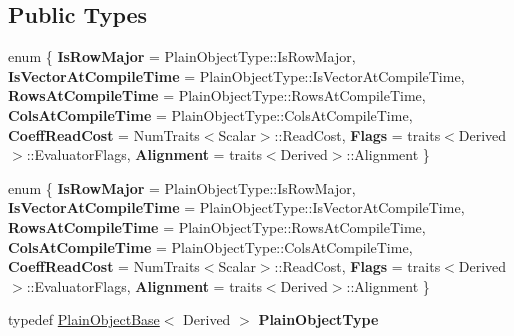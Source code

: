 \subsection*{Public Types}
\begin{DoxyCompactItemize}
\item 
\mbox{\label{struct_eigen_1_1internal_1_1evaluator_3_01_plain_object_base_3_01_derived_01_4_01_4_a0f2405d7d8d87297e15fea258be9bc15}} 
enum \{ \newline
{\bfseries Is\+Row\+Major} = Plain\+Object\+Type\+:\+:Is\+Row\+Major, 
{\bfseries Is\+Vector\+At\+Compile\+Time} = Plain\+Object\+Type\+:\+:Is\+Vector\+At\+Compile\+Time, 
{\bfseries Rows\+At\+Compile\+Time} = Plain\+Object\+Type\+:\+:Rows\+At\+Compile\+Time, 
{\bfseries Cols\+At\+Compile\+Time} = Plain\+Object\+Type\+:\+:Cols\+At\+Compile\+Time, 
\newline
{\bfseries Coeff\+Read\+Cost} = Num\+Traits$<$Scalar$>$\+:\+:Read\+Cost, 
{\bfseries Flags} = traits$<$Derived$>$\+:\+:Evaluator\+Flags, 
{\bfseries Alignment} = traits$<$Derived$>$\+:\+:Alignment
 \}
\item 
\mbox{\label{struct_eigen_1_1internal_1_1evaluator_3_01_plain_object_base_3_01_derived_01_4_01_4_a2e969ae56692f3529f2f3fa5e3b25924}} 
enum \{ \newline
{\bfseries Is\+Row\+Major} = Plain\+Object\+Type\+:\+:Is\+Row\+Major, 
{\bfseries Is\+Vector\+At\+Compile\+Time} = Plain\+Object\+Type\+:\+:Is\+Vector\+At\+Compile\+Time, 
{\bfseries Rows\+At\+Compile\+Time} = Plain\+Object\+Type\+:\+:Rows\+At\+Compile\+Time, 
{\bfseries Cols\+At\+Compile\+Time} = Plain\+Object\+Type\+:\+:Cols\+At\+Compile\+Time, 
\newline
{\bfseries Coeff\+Read\+Cost} = Num\+Traits$<$Scalar$>$\+:\+:Read\+Cost, 
{\bfseries Flags} = traits$<$Derived$>$\+:\+:Evaluator\+Flags, 
{\bfseries Alignment} = traits$<$Derived$>$\+:\+:Alignment
 \}
\item 
\mbox{\label{struct_eigen_1_1internal_1_1evaluator_3_01_plain_object_base_3_01_derived_01_4_01_4_a76a6d1a9b3268d7aa837046092882c57}} 
typedef \hyperlink{class_eigen_1_1_plain_object_base}{Plain\+Object\+Base}$<$ Derived $>$ {\bfseries Plain\+Object\+Type}

\end{DoxyCompactItemize}
